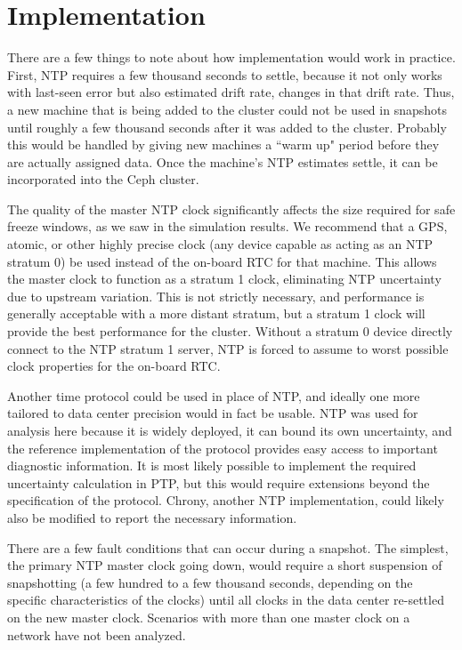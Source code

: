 \chapter{Implementation}
\label{sec:impl}

There are a few things to note about how implementation would work in
practice. First, NTP requires a few thousand seconds to settle,
because it not only works with last-seen error but also estimated
drift rate, changes in that drift rate. Thus, a new machine that is
being added to the cluster could not be used in snapshots until
roughly a few thousand seconds after it was added to the
cluster. Probably this would be handled by giving new machines a ``warm
up" period before they are actually assigned data. Once the machine's
NTP estimates settle, it can be incorporated into the Ceph cluster.

The quality of the master NTP clock significantly affects the size
required for safe freeze windows, as we saw in the simulation
results. We recommend that a GPS, atomic, or other highly precise
clock (any device capable as acting as an NTP stratum 0) be used
instead of the on-board RTC for that machine. This allows the master
clock to function as a stratum 1 clock, eliminating NTP uncertainty
due to upstream variation. This is not strictly necessary, and
performance is generally acceptable with a more distant stratum, but a
stratum 1 clock will provide the best performance for the
cluster. Without a stratum 0 device directly connect to the NTP
stratum 1 server, NTP is forced to assume to worst possible clock
properties for the on-board RTC.

Another time protocol could be used in place of NTP, and ideally one
more tailored to data center precision would in fact be usable. NTP
was used for analysis here because it is widely deployed, it can bound
its own uncertainty, and the reference implementation of the protocol
provides easy access to important diagnostic information. It is most
likely possible to implement the required uncertainty calculation in
PTP, but this would require extensions beyond the specification of the
protocol. Chrony, another NTP implementation, could likely also be
modified to report the necessary information.

There are a few fault conditions that can occur during a snapshot. The
simplest, the primary NTP master clock going down, would require a
short suspension of snapshotting (a few hundred to a few thousand
seconds, depending on the specific characteristics of the clocks)
until all clocks in the data center re-settled on the new master
clock. Scenarios with more than one master clock on a network have not
been analyzed.

